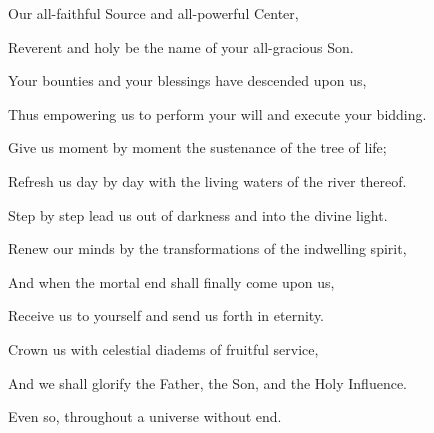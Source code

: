 \begin{quoting}[vskip=\baselineskip,leftmargin=4ex,rightmargin=2ex]
\setlength{\parindent}{-0.7em}
\hspace*{-1.2em}
Our all\hyp{}faithful Source and all\hyp{}powerful Center,\par
Reverent and holy be the name of your all\hyp{}gracious Son.\par
Your bounties and your blessings have descended upon us,\par
Thus empowering us to perform your will and execute your bidding.\par
Give us moment by moment the sustenance of the tree of life;\par
Refresh us day by day with the living waters of the river thereof.\par
Step by step lead us out of darkness and into the divine light.\par
Renew our minds by the transformations of the indwelling spirit,\par
And when the mortal end shall finally come upon us,\par
Receive us to yourself and send us forth in eternity.\par
Crown us with celestial diadems of fruitful service,\par
And we shall glorify the Father, the Son, and the Holy Influence.\par
Even so, throughout a universe without end.\par
\end{quoting}
\separatorshort
